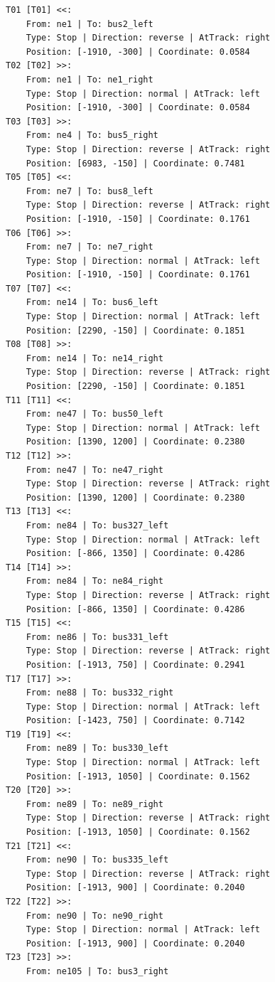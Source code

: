 	\begin{lstlisting}[language = {}, tabsize=4, basicstyle=\footnotesize\ttfamily, showspaces=false, showstringspaces=false, caption = Signalling.RNA, label = {lst:EJ3_6}]
T01 [T01] <<:
	From: ne1 | To: bus2_left
	Type: Stop | Direction: reverse | AtTrack: right 
	Position: [-1910, -300] | Coordinate: 0.0584
T02 [T02] >>:
	From: ne1 | To: ne1_right
	Type: Stop | Direction: normal | AtTrack: left 
	Position: [-1910, -300] | Coordinate: 0.0584
T03 [T03] >>:
	From: ne4 | To: bus5_right
	Type: Stop | Direction: reverse | AtTrack: right 
	Position: [6983, -150] | Coordinate: 0.7481
T05 [T05] <<:
	From: ne7 | To: bus8_left
	Type: Stop | Direction: reverse | AtTrack: right 
	Position: [-1910, -150] | Coordinate: 0.1761
T06 [T06] >>:
	From: ne7 | To: ne7_right	
	Type: Stop | Direction: normal | AtTrack: left 
	Position: [-1910, -150] | Coordinate: 0.1761
T07 [T07] <<:
	From: ne14 | To: bus6_left
	Type: Stop | Direction: normal | AtTrack: left 
	Position: [2290, -150] | Coordinate: 0.1851
T08 [T08] >>:
	From: ne14 | To: ne14_right
	Type: Stop | Direction: reverse | AtTrack: right 
	Position: [2290, -150] | Coordinate: 0.1851
T11 [T11] <<:
	From: ne47 | To: bus50_left
	Type: Stop | Direction: normal | AtTrack: left 
	Position: [1390, 1200] | Coordinate: 0.2380
T12 [T12] >>:
	From: ne47 | To: ne47_right
	Type: Stop | Direction: reverse | AtTrack: right 
	Position: [1390, 1200] | Coordinate: 0.2380
T13 [T13] <<:
	From: ne84 | To: bus327_left
	Type: Stop | Direction: normal | AtTrack: left 
	Position: [-866, 1350] | Coordinate: 0.4286
T14 [T14] >>:
	From: ne84 | To: ne84_right
	Type: Stop | Direction: reverse | AtTrack: right 
	Position: [-866, 1350] | Coordinate: 0.4286
T15 [T15] <<:
	From: ne86 | To: bus331_left
	Type: Stop | Direction: reverse | AtTrack: right 
	Position: [-1913, 750] | Coordinate: 0.2941
T17 [T17] >>:
	From: ne88 | To: bus332_right
	Type: Stop | Direction: normal | AtTrack: left 
	Position: [-1423, 750] | Coordinate: 0.7142
T19 [T19] <<:
	From: ne89 | To: bus330_left
	Type: Stop | Direction: normal | AtTrack: left 
	Position: [-1913, 1050] | Coordinate: 0.1562
T20 [T20] >>:
	From: ne89 | To: ne89_right
	Type: Stop | Direction: reverse | AtTrack: right 
	Position: [-1913, 1050] | Coordinate: 0.1562
T21 [T21] <<:
	From: ne90 | To: bus335_left
	Type: Stop | Direction: reverse | AtTrack: right 
	Position: [-1913, 900] | Coordinate: 0.2040
T22 [T22] >>:
	From: ne90 | To: ne90_right
	Type: Stop | Direction: normal | AtTrack: left 
	Position: [-1913, 900] | Coordinate: 0.2040
T23 [T23] >>:
	From: ne105 | To: bus3_right

\end{lstlisting}
